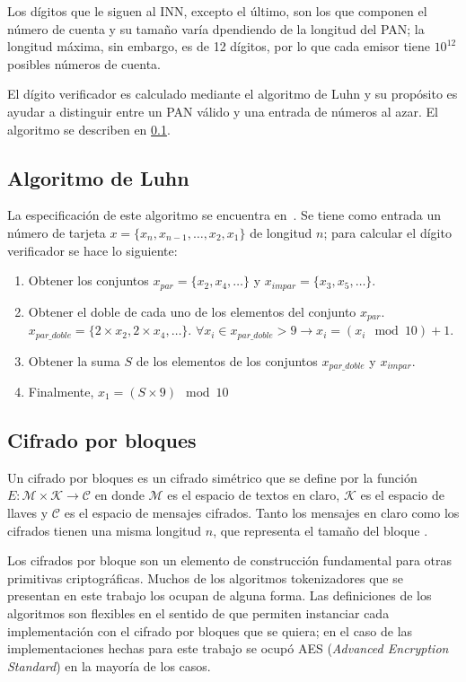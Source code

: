   Los dígitos que le siguen al INN, excepto el último, son los que componen el
  número de cuenta y su tamaño varía dpendiendo de la longitud del PAN; la
  longitud máxima, sin embargo, es de 12 dígitos, por lo que cada emisor tiene
  $10^{12}$ posibles números de cuenta.

  El dígito verificador es calculado mediante el algoritmo de Luhn y su
  propósito es ayudar a distinguir entre un PAN válido y una entrada de números
  al azar. El algoritmo se describen en \ref{subsec:algoritmo_luhn}.

  \subsection{Algoritmo de Luhn}
  \label{subsec:algoritmo_luhn}
  La especificación de este algoritmo se encuentra en~\cite{iso_7812}. Se tiene
  como entrada un número de tarjeta $ x = \{x_n, x_{n-1}, \dots, x_2, x_1\}$ de
  longitud $ n $; para calcular el dígito verificador se hace lo siguiente:
  \begin{enumerate}
    \item Obtener los conjuntos $x_{par} = \{x_2, x_4, \dots\}$ y
      $x_{impar} = \{x_3, x_5, \dots\}$.
    \item Obtener el doble de cada uno de los elementos del conjunto $x_{par}$.
      $x_{par\_doble} = \{2 \times x_2, 2 \times x_4, \dots\}$.
      $\forall x_i \in x_{par\_doble} > 9 \rightarrow x_i = (x_i \mod 10) + 1$.
    \item Obtener la suma $ S $ de los elementos de los conjuntos $x_{par\_doble}$ y
      $x_{impar}$.
    \item Finalmente, $x_1 = (S \times 9) \mod 10$
  \end{enumerate}


\subsection{Cifrado por bloques}

Un cifrado por bloques es un cifrado simétrico que se define por la función $ E:
\mathcal{M} \times \mathcal{K} \rightarrow \mathcal{C} $ en donde $ \mathcal{M} $
es el espacio de textos en claro, $ \mathcal{K} $ es el espacio de llaves y $
\mathcal{C} $ es el espacio de mensajes cifrados. Tanto los mensajes en claro
como los cifrados tienen una misma longitud $ n $, que representa el tamaño del
bloque \cite{menezes}.

Los cifrados por bloque son un elemento de construcción fundamental para otras
primitivas criptográficas. Muchos de los algoritmos tokenizadores que se
presentan en este trabajo los ocupan de alguna forma. Las definiciones de los
algoritmos son flexibles en el sentido de que permiten instanciar cada
implementación con el cifrado por bloques que se quiera; en el caso de las
implementaciones hechas para este trabajo se ocupó AES (\textit{Advanced
Encryption Standard}) en la mayoría de los casos.

